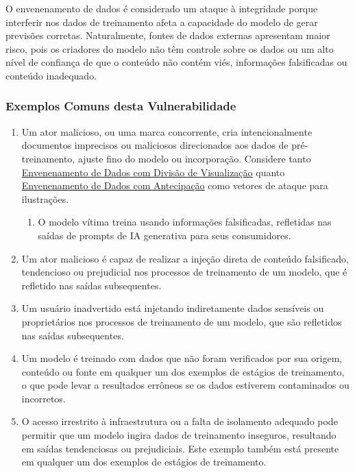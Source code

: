 \documentclass[
]{article}
\providecommand{\tightlist}{%
  \setlength{\itemsep}{0pt}\setlength{\parskip}{0pt}}
\begin{document}
O envenenamento de dados é considerado um ataque à integridade porque
interferir nos dados de treinamento afeta a capacidade do modelo de
gerar previsões corretas. Naturalmente, fontes de dados externas
apresentam maior risco, pois os criadores do modelo não têm controle
sobre os dados ou um alto nível de confiança de que o conteúdo não
contém viés, informações falsificadas ou conteúdo inadequado.

\subsubsection{Exemplos Comuns desta
Vulnerabilidade}\label{exemplos-comuns-desta-vulnerabilidade}

\begin{enumerate}
\def\labelenumi{\arabic{enumi}.}
\tightlist
\item
  Um ator malicioso, ou uma marca concorrente, cria intencionalmente
  documentos imprecisos ou maliciosos direcionados aos dados de
  pré-treinamento, ajuste fino do modelo ou incorporação. Considere
  tanto
  \href{https://github.com/GangGreenTemperTatum/speaking/blob/main/dc604/hacker-summer-camp-23/Ads\%20_\%20Poisoning\%20Web\%20Training\%20Datasets\%20_\%20Flow\%20Diagram\%20-\%20Exploit\%201\%20Split-View\%20Data\%20Poisoning.jpeg}{Envenenamento
  de Dados com Divisão de Visualização} quanto
  \href{https://github.com/GangGreenTemperTatum/speaking/blob/main/dc604/hacker-summer-camp-23/Ads\%20_\%20Poisoning\%20Web\%20Training\%20Datasets\%20_\%20Flow\%20Diagram\%20-\%20Exploit\%202\%20Frontrunning\%20Data\%20Poisoning.jpeg}{Envenenamento
  de Dados com Antecipação} como vetores de ataque para ilustrações.

  \begin{enumerate}
  \def\labelenumii{\arabic{enumii}.}
  \tightlist
  \item
    O modelo vítima treina usando informações falsificadas, refletidas
    nas saídas de prompts de IA generativa para seus consumidores.
  \end{enumerate}
\item
  Um ator malicioso é capaz de realizar a injeção direta de conteúdo
  falsificado, tendencioso ou prejudicial nos processos de treinamento
  de um modelo, que é refletido nas saídas subsequentes.
\item
  Um usuário inadvertido está injetando indiretamente dados sensíveis ou
  proprietários nos processos de treinamento de um modelo, que são
  refletidos nas saídas subsequentes.
\item
  Um modelo é treinado com dados que não foram verificados por sua
  origem, conteúdo ou fonte em qualquer um dos exemplos de estágios de
  treinamento, o que pode levar a resultados errôneos se os dados
  estiverem contaminados ou incorretos.
\item
  O acesso irrestrito à infraestrutura ou a falta de isolamento adequado
  pode permitir que um modelo ingira dados de treinamento inseguros,
  resultando em saídas tendenciosas ou prejudiciais. Este exemplo também
  está presente em qualquer um dos exemplos de estágios de treinamento.


\end{enumerate}
\end{document}
